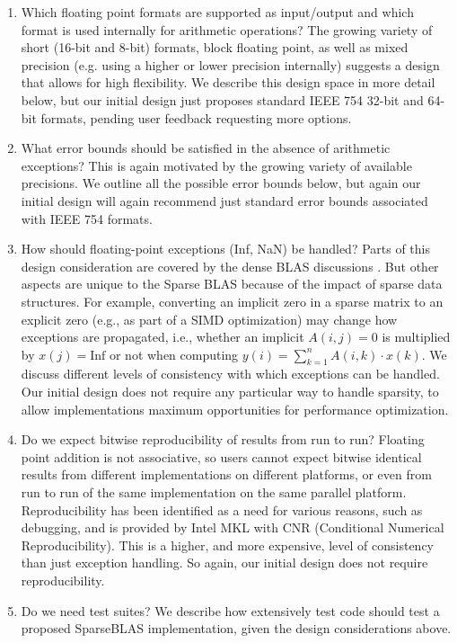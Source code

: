 \documentclass{article}
\begin{document}
\begin{enumerate}
    \item
    Which floating point formats are supported as input/output and 
    which format is used internally for arithmetic operations?
    The growing variety of short (16-bit and 8-bit) formats, 
    block floating point, as well as
    mixed precision (e.g. using a higher or lower precision internally) suggests a design that allows for high flexibility. We describe this design space in more
    detail below, but our initial design just proposes
    standard IEEE 754 32-bit and 64-bit formats, pending user feedback requesting more
    options. 
    \item What error bounds should be satisfied in the
    absence of arithmetic exceptions? This is again 
    motivated by the growing variety of available precisions.
    We outline all the possible error bounds below, but again
    our initial design will again recommend just standard error bounds associated with
    IEEE 754 formats.
    \item How should floating-point exceptions (Inf, NaN) be handled?
    Parts of this design consideration are covered by the 
    dense BLAS discussions \cite{Proposed_BLAS_LAPACK_exception_handling}. But other aspects are unique
to the Sparse BLAS because of the impact of sparse data structures. For example, converting an implicit zero in
a sparse matrix to an explicit zero (e.g., as part of a
SIMD optimization) may change how exceptions are 
propagated, i.e., whether an implicit $A(i,j)=0$ is
multiplied by $x(j) = \text{Inf}$ or not when computing
$y(i) = \sum_{k=1}^n A(i,k) \cdot x(k)$. We discuss
different levels of consistency with which exceptions
can be handled. Our initial design does not require any particular way to handle
sparsity, to allow implementations maximum opportunities for performance
optimization.
\item Do we expect bitwise reproducibility of results from run to run?
Floating point addition is not associative, so users
cannot expect bitwise identical results from different
implementations on different platforms, or even from
run to run of the same implementation on the same
parallel platform. Reproducibility has been identified
as a need for various reasons, such as debugging, and is provided
by Intel MKL with CNR (Conditional Numerical
Reproducibility).
This is a higher, and more expensive, 
level of consistency than just exception handling. So again, our initial design
does not require reproducibility.
\item Do we need test suites? We describe how extensively test code
should test a proposed SparseBLAS implementation, given
the design considerations above.
\end{enumerate}
\end{document}
